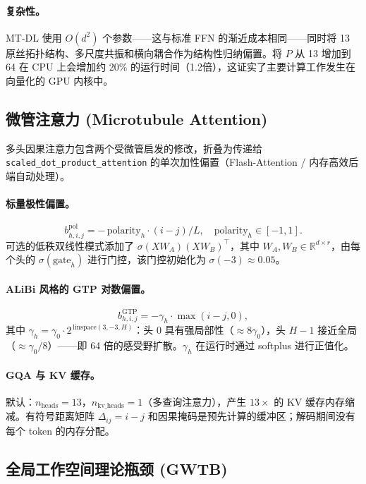 \documentclass[11pt]{article}
\theoremstyle{definition}
\newcommand{\RR}{\mathbb{R}}
\newcommand{\sigmoid}{\sigma}
\begin{document}
\paragraph{复杂性。}
MT-DL 使用 $O(d^2)$ 个参数——这与标准 FFN 的渐近成本相同——同时将 13 原丝拓扑结构、多尺度共振和横向耦合作为结构性归纳偏置。将 $P$ 从 13 增加到 64 在 CPU 上会增加约 20\% 的运行时间（1.2倍），这证实了主要计算工作发生在向量化的 GPU 内核中。

\subsection{微管注意力 (Microtubule Attention)}
\label{sec:attn}

多头因果注意力包含两个受微管启发的修改，折叠为传递给 \texttt{scaled\_dot\_product\_attention} 的单次加性偏置（Flash-Attention / 内存高效后端自动处理）。

\paragraph{标量极性偏置。}
\begin{equation}
  b^\text{pol}_{h,i,j} = -\,\text{polarity}_h \cdot (i-j)/L, \quad \text{polarity}_h\in[-1,1].
\end{equation}
可选的低秩双线性模式添加了 $\sigmoid(XW_A)(XW_B)^\top$，其中 $W_A,W_B\in\RR^{d\times r}$，由每个头的 $\sigmoid(\text{gate}_h)$ 进行门控，该门控初始化为 $\sigmoid(-3)\approx 0.05$。

\paragraph{ALiBi 风格的 GTP 对数偏置。}
\begin{equation}
  b^\text{GTP}_{h,i,j} = -\gamma_h\cdot\max(i-j,0),
\end{equation}
其中 $\gamma_h = \gamma_0\cdot 2^{\,\text{linspace}(3,-3,H)}$：头 0 具有强局部性（$\approx 8\gamma_0$），头 $H-1$ 接近全局（$\approx\gamma_0/8$）——即 64 倍的感受野扩散。$\gamma_h$ 在运行时通过 softplus 进行正值化。

\paragraph{GQA 与 KV 缓存。}
默认：$n_\text{heads}=13$，$n_\text{kv\_heads}=1$（多查询注意力），产生 $13\times$ 的 KV 缓存内存缩减。有符号距离矩阵 $\Delta_{ij}=i-j$ 和因果掩码是预先计算的缓冲区；解码期间没有每个 token 的内存分配。

\subsection{全局工作空间理论瓶颈 (GWTB)}
\label{sec:gwtb}
\end{document}
